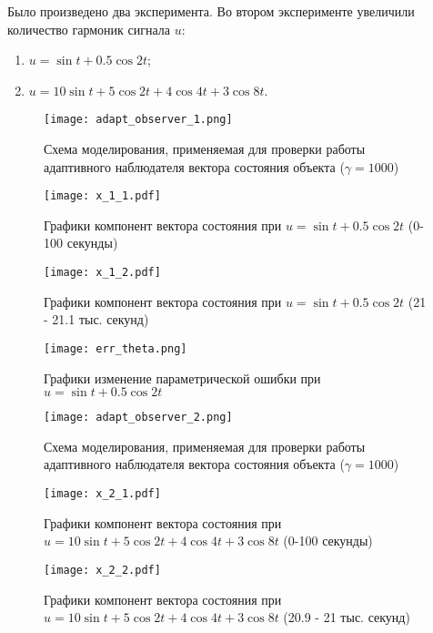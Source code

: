 Было произведено два эксперимента. Во втором эксперименте увеличили количество гармоник сигнала $u$:
\begin{enumerate}
	\item $u = \sin{t} + 0.5 \cos{2 t}$;
	\item $u = 10 \sin{t} + 5 \cos{2 t} + 4 \cos{4 t} + 3 \cos{8 t}$.
\end{enumerate}
\begin{figure}[h]
    \centering
    \texttt{[image: adapt\_observer\_1.png]}
    \caption{Схема моделирования, применяемая для проверки работы адаптивного наблюдателя вектора состояния объекта ($\gamma = 1000$)}
    \label{sh1}
\end{figure}

\begin{figure}[p]
    \centering
    \texttt{[image: x\_1\_1.pdf]}
    \caption{Графики компонент вектора состояния при $u = \sin{t} + 0.5 \cos{2 t}$ (0-100 секунды)}
    \label{x11}
\end{figure}

\begin{figure}[p]
	\centering
	\texttt{[image: x\_1\_2.pdf]}
	\caption{Графики компонент вектора состояния при $u = \sin{t} + 0.5 \cos{2 t}$ (21 - 21.1 тыс. секунд)}
	\label{x12}
\end{figure}

\begin{figure}[p]
	\centering
	\texttt{[image: err\_theta.png]}
	\caption{Графики изменение параметрической ошибки при $u = \sin{t} + 0.5 \cos{2 t}$ }
	\label{err_th}
\end{figure}

\begin{figure}[p]
	\centering
	\texttt{[image: adapt\_observer\_2.png]}
	\caption{Схема моделирования, применяемая для проверки работы адаптивного наблюдателя вектора состояния объекта ($\gamma = 1000$)}
	\label{sh2}
\end{figure}
\clearpage
\begin{figure}[p]
	\centering
	\texttt{[image: x\_2\_1.pdf]}
	\caption{Графики компонент вектора состояния при $u = 10 \sin{t} + 5 \cos{2 t} + 4 \cos{4 t} + 3 \cos{8 t}$ (0-100 секунды)}
	\label{x21}
\end{figure}

\begin{figure}[p]
	\centering
	\texttt{[image: x\_2\_2.pdf]}
	\caption{Графики компонент вектора состояния при $u = 10 \sin{t} + 5 \cos{2 t} + 4 \cos{4 t} + 3 \cos{8 t}$ (20.9 - 21 тыс. секунд)}
	\label{x22}
\end{figure}

